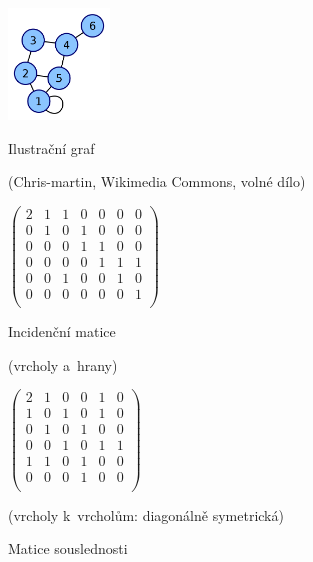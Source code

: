 \begin{figure}[ht!]
    \centering
    \begin{minipage}{0.25\textwidth}
        \centering
        \includegraphics[height=8em]{images/3_graf-matice-souslednosti}
        \caption[Ilustrační graf]{Ilustrační graf}
        \label{ilustracni-graf-matice}
        {\tiny (Chris-martin, Wikimedia Commons, volné dílo)}
    \end{minipage}%
    \begin{minipage}{0.35\textwidth}
        \centering
        $\left( \begin{matrix}
                    2 & 1 & 1 & 0 & 0 & 0 & 0 \\
                    0 & 1 & 0 & 1 & 0 & 0 & 0 \\
                    0 & 0 & 0 & 1 & 1 & 0 & 0 \\
                    0 & 0 & 0 & 0 & 1 & 1 & 1 \\
                    0 & 0 & 1 & 0 & 0 & 1 & 0 \\
                    0 & 0 & 0 & 0 & 0 & 0 & 1 \\
                \end{matrix} \right)$
        \caption[Incidenční matice]{Incidenční matice}
        (vrcholy a~hrany)
    \end{minipage}%
    \begin{minipage}{0.3\textwidth}
        \centering
        $\left( \begin{matrix}
                    2 & 1 & 0 & 0 & 1 & 0 \\
                    1 & 0 & 1 & 0 & 1 & 0 \\
                    0 & 1 & 0 & 1 & 0 & 0 \\
                    0 & 0 & 1 & 0 & 1 & 1 \\
                    1 & 1 & 0 & 1 & 0 & 0 \\
                    0 & 0 & 0 & 1 & 0 & 0 \\
                \end{matrix} \right)$
        \caption[Matice souslednosti]{Matice souslednosti}
        (vrcholy k~vrcholům: diagonálně symetrická)
    \end{minipage}
\end{figure}
\FloatBarrier


